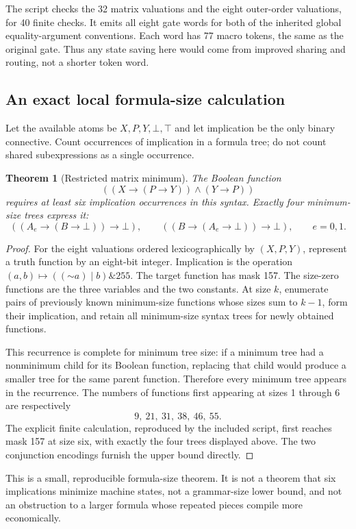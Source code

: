 \documentclass[11pt,letterpaper]{article}
\newtheorem{theorem}{Theorem}[section]
\newcommand{\imp}{\mathbin{\to}}
\begin{document}
The script checks the 32 matrix valuations and the eight outer-order
valuations, for 40 finite checks. It emits all eight gate words for both
of the inherited global equality-argument conventions. Each word has 77
macro tokens, the same as the original gate. Thus any state saving here
would come from improved sharing and routing, not a shorter token word.

\subsection{An exact local formula-size calculation}

Let the available atoms be $X,P,Y,\bot,\top$ and let implication be the only
binary connective. Count occurrences of implication in a formula tree; do
not count shared subexpressions as a single occurrence.

\begin{theorem}[Restricted matrix minimum]
The Boolean function
\[
 ((X\imp(P\imp Y))\wedge(Y\imp P))
\]
requires at least six implication occurrences in this syntax. Exactly four
minimum-size trees express it:
\[
 ((A_e\imp(B\imp\bot))\imp\bot),\qquad
 ((B\imp(A_e\imp\bot))\imp\bot),\qquad e=0,1.
\]
\end{theorem}
\begin{proof}
For the eight valuations ordered lexicographically by $(X,P,Y)$, represent
a truth function by an eight-bit integer. Implication is the operation
$(a,b)\mapsto ((\mathord{\sim}a)\mathbin{|}b)\mathbin{\&}255$.
The target function has mask 157. The size-zero functions are the three
variables and the two constants. At size $k$, enumerate pairs of previously
known minimum-size functions whose sizes sum to $k-1$, form their implication,
and retain all minimum-size syntax trees for newly obtained functions.

This recurrence is complete for minimum tree size: if a minimum tree had a
nonminimum child for its Boolean function, replacing that child would produce
a smaller tree for the same parent function. Therefore every minimum tree
appears in the recurrence. The numbers of functions first appearing at
sizes 1 through 6 are respectively
\[
 9,\ 21,\ 31,\ 38,\ 46,\ 55.
\]
The explicit finite calculation, reproduced by the included script, first
reaches mask 157 at size six, with exactly the four trees displayed above.
The two conjunction encodings furnish the upper bound directly.
\end{proof}

This is a small, reproducible formula-size theorem. It is not a theorem that
six implications minimize machine states, not a grammar-size lower bound,
and not an obstruction to a larger formula whose repeated pieces compile
more economically.
\end{document}
